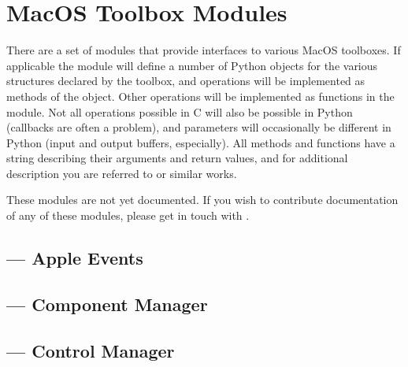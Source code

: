 \chapter{MacOS Toolbox Modules \label{toolbox}}

There are a set of modules that provide interfaces to various MacOS
toolboxes.  If applicable the module will define a number of Python
objects for the various structures declared by the toolbox, and
operations will be implemented as methods of the object.  Other
operations will be implemented as functions in the module.  Not all
operations possible in C will also be possible in Python (callbacks
are often a problem), and parameters will occasionally be different in
Python (input and output buffers, especially).  All methods and
functions have a  string describing their arguments
and return values, and for additional description you are referred to
 or similar works.


  These modules are not yet documented.  If you
wish to contribute documentation of any of these modules, please get
in touch with .

\localmoduletable




\section{ --- Apple Events}


\section{ --- Component Manager}


\section{ --- Control Manager}


